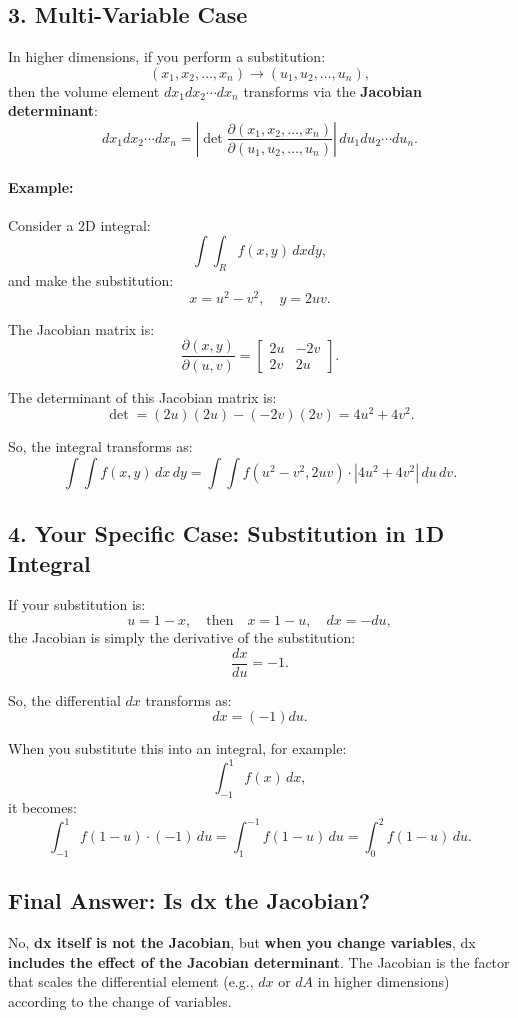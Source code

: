 \documentclass[12pt]{article}
\begin{document}
\subsection*{3. Multi-Variable Case}
In higher dimensions, if you perform a substitution:
\[ (x_1, x_2, \dots, x_n) \to (u_1, u_2, \dots, u_n), \]
then the volume element $dx_1 dx_2 \cdots dx_n$ transforms via the \textbf{Jacobian determinant}:
\[
dx_1 dx_2 \cdots dx_n = \left| \det \frac{\partial(x_1, x_2, \dots, x_n)}{\partial(u_1, u_2, \dots, u_n)} \right| \, du_1 du_2 \cdots du_n.
\]

\paragraph{Example:}
Consider a 2D integral:
\[
\int \int_{R} f(x, y) \, dx dy,
\]
and make the substitution:
\[
x = u^2 - v^2, \quad y = 2uv.
\]

The Jacobian matrix is:
\[
\frac{\partial(x, y)}{\partial(u, v)} =
\begin{bmatrix}
2u & -2v \\
2v & 2u
\end{bmatrix}.
\]

The determinant of this Jacobian matrix is:
\[
\det = (2u)(2u) - (-2v)(2v) = 4u^2 + 4v^2.
\]

So, the integral transforms as:
\[
\int \int f(x, y) \, dx \, dy = \int \int f(u^2 - v^2, 2uv) \cdot |4u^2 + 4v^2| \, du \, dv.
\]

\subsection*{4. Your Specific Case: Substitution in 1D Integral}
If your substitution is:
\[ u = 1 - x, \quad \text{then} \quad x = 1 - u, \quad dx = -du, \]
the Jacobian is simply the derivative of the substitution:
\[
\frac{dx}{du} = -1.
\]

So, the differential $dx$ transforms as:
\[
dx = (-1) du.
\]

When you substitute this into an integral, for example:
\[
\int_{-1}^1 f(x) \, dx,
\]
it becomes:
\[
\int_{-1}^1 f(1-u) \cdot (-1) \, du = \int_1^{-1} f(1-u) \, du = \int_0^2 f(1-u) \, du.
\]

\subsection*{Final Answer: Is dx the Jacobian?}
No, \textbf{dx itself is not the Jacobian}, but \textbf{when you change variables}, dx \textbf{includes the effect of the Jacobian determinant}. The Jacobian is the factor that scales the differential element (e.g., $dx$ or $dA$ in higher dimensions) according to the change of variables.
\end{document}
